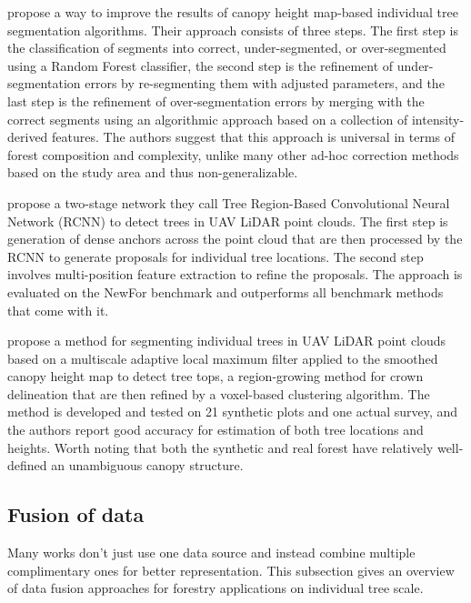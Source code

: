 \citet{lisiewiczCorrectingResultsCHMBased2022} propose a way to improve the results of canopy height map-based individual tree segmentation algorithms.
Their approach consists of three steps.
The first step is the classification of segments into correct, under-segmented, or over-segmented using a Random Forest classifier, the second step is the refinement of under-segmentation errors by re-segmenting them with adjusted parameters, and the last step is the refinement of over-segmentation errors by merging with the correct segments using an algorithmic approach based on a collection of intensity-derived features.
The authors suggest that this approach is universal in terms of forest composition and complexity, unlike many other ad-hoc correction methods based on the study area and thus non-generalizable.

\citet{wangAutomaticDetectionIndividual2023} propose a two-stage network they call Tree Region-Based Convolutional Neural Network (RCNN) to detect trees in UAV LiDAR point clouds.
The first step is generation of dense anchors across the point cloud that are then processed by the RCNN to generate proposals for individual tree locations.
The second step involves multi-position feature extraction to refine the proposals.
The approach is evaluated on the NewFor benchmark \citep{eysnAlpineITDBenchmark2015} and outperforms all benchmark methods that come with it.

\citet{fuIndividualTreeSegmentationUAV2024} propose a method for segmenting individual trees in UAV LiDAR point clouds based on a multiscale adaptive local maximum filter applied to the smoothed canopy height map to detect tree tops, a region-growing method for crown delineation that are then refined by a voxel-based clustering algorithm.
The method is developed and tested on 21 synthetic plots and one actual survey, and the authors report good accuracy for estimation of both tree locations and heights.
Worth noting that both the synthetic and real forest have relatively well-defined an unambiguous canopy structure.

\subsection{Fusion of data}

Many works don't just use one data source and instead combine multiple complimentary ones for better representation.
This subsection gives an overview of data fusion approaches for forestry applications on individual tree scale.


